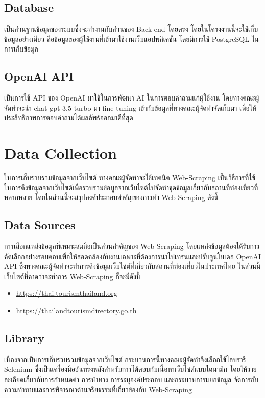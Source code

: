 \documentclass[12pt,oneside,openright,a4paper]{cpe-thai-project}
\begin{document}
\subsection{Database}
เป็นส่วนฐานข้อมูลของระบบซึ่งจะทำงานกับส่วนของ Back-end โดยตรง โดยในโครงงานนี้จะใช้เก็บข้อมูลอย่างเดียว คือข้อมูลของผู้ใช้งานที่เข้ามาใช้งานเว็บแอปพลิเคชัน โดยมีการใช้ PostgreSQL ในการเก็บข้อมูล

\subsection{OpenAI API}
เป็นการใช้ API ของ OpenAI มาใช้ในการพัฒนา AI ในการตอบคำถามแก่ผู้ใช้งาน โดยทางคณะผู้จัดทำจะนำ chat-gpt-3.5 turbo มา fine-tuning เข้ากับข้อมูลที่ทางคณะผู้จัดทำจัดเก็บมา เพื่อให้ประสิทธิภาพการตอบคำถามได้ผลลัพธ์ออกมาดีที่สุด

\section{Data Collection}
ในการเก็บรวบรวมข้อมูลจากเว็บไซต์ ทางคณะผู้จัดทำจะใช้เทคนิค Web-Scraping เป็นวิธีการที่ใช้ในการดึงข้อมูลจากเว็บไซต์เพื่อรวบรวมข้อมูลจากเว็บไซต์ไปจัดทำชุดข้อมูลเกี่ยวกับสถานที่ท่องเที่ยวที่หลากหลาย โดยในส่วนนี้จะสรุปองค์ประกอบสำคัญของการทำ Web-Scraping ดังนี้
\subsection{Data Sources}
การเลือกแหล่งข้อมูลที่เหมาะสมถือเป็นส่วนสำคัญของ Web-Scraping โดยแหล่งข้อมูลต้องได้รับการคัดเลือกอย่างรอบคอบเพื่อให้สอดคล้องกับงานเฉพาะที่ต้องการนำไปเทรนและปรับจูนโมเดล OpenAI API ซึ่งทางคณะผู้จัดทำจะทำการดึงข้อมูลเว็บไซต์ที่เกี่ยวกับสถานที่ท่องเที่ยวในประเทศไทย ในส่วนนี้เว็บไซต์ที่คาดว่าจะทำการ Web-Scraping ก็จะมีดังนี้
\begin{itemize}
\item \href{https://thai.tourismthailand.org/Search-result/attraction?sort\_by=datetime\_updated\_desc\&page=1\&perpage=15\&menu=attraction} {https://thai.tourismthailand.org}
\item \href{https://thailandtourismdirectory.go.th/attraction?page=1\&province\_id=50} {https://thailandtourismdirectory.go.th}
\end{itemize}

\subsection{Library}
เนื่องจากเป็นการเก็บรวบรวมข้อมูลจากเว็บไซต์ กระบวนการนี้ทางคณะผู้จัดทำจึงเลือกใช้ไลบรารี Selenium ซึ่งเป็นเครื่องมืออันทรงพลังสำหรับการโต้ตอบกับเนื้อหาเว็บไซต์แบบไดนามิก โดยให้รายละเอียดเกี่ยวกับการกำหนดค่า การนำทาง การระบุองค์ประกอบ และกระบวนการแยกข้อมูล จัดการกับความท้าทายและการพิจารณาด้านจริยธรรมที่เกี่ยวข้องกับ Web-Scraping 
	
\end{document}
